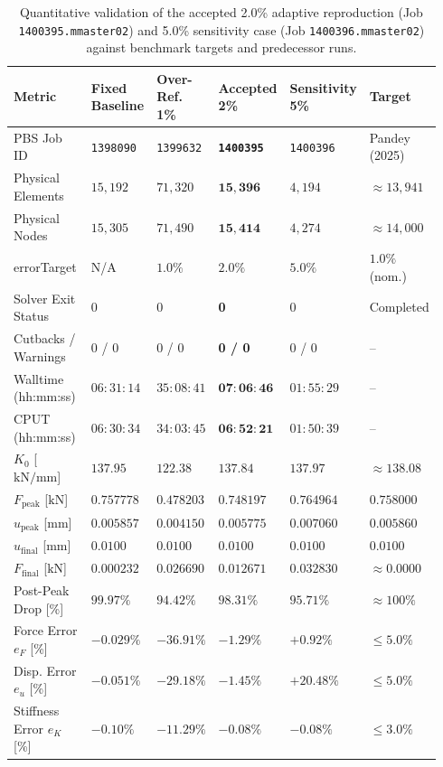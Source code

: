 \begin{table}[htbp]
\centering
\caption{Quantitative validation of the accepted 2.0\% adaptive reproduction (Job \texttt{1400395.mmaster02}) and 5.0\% sensitivity case (Job \texttt{1400396.mmaster02}) against benchmark targets and predecessor runs.}
\label{tab:task5_final_metrics}
\footnotesize
\begin{tabularx}{\linewidth}{p{0.22\linewidth}p{0.14\linewidth}p{0.14\linewidth}p{0.16\linewidth}p{0.16\linewidth}p{0.12\linewidth}}
\toprule
\textbf{Metric} & \textbf{Fixed Baseline} & \textbf{Over-Ref. 1\%} & \textbf{Accepted 2\%} & \textbf{Sensitivity 5\%} & \textbf{Target} \\
\midrule
PBS Job ID & \texttt{1398090} & \texttt{1399632} & \textbf{\texttt{1400395}} & \texttt{1400396} & Pandey (2025) \\
Physical Elements & $15{,}192$ & $71{,}320$ & $\mathbf{15{,}396}$ & $4{,}194$ & $\approx 13{,}941$ \\
Physical Nodes & $15{,}305$ & $71{,}490$ & $\mathbf{15{,}414}$ & $4{,}274$ & $\approx 14{,}000$ \\
errorTarget & N/A & $1.0\%$ & $\mathbf{2.0\%}$ & $5.0\%$ & $1.0\%$ (nom.) \\
Solver Exit Status & 0 & 0 & \textbf{0} & 0 & Completed \\
Cutbacks / Warnings & 0 / 0 & 0 / 0 & \textbf{0 / 0} & 0 / 0 & -- \\
Walltime (hh:mm:ss) & $06:31:14$ & $35:08:41$ & $\mathbf{07:06:46}$ & $01:55:29$ & -- \\
CPUT (hh:mm:ss) & $06:30:34$ & $34:03:45$ & $\mathbf{06:52:21}$ & $01:50:39$ & -- \\
\midrule
$K_0$ [$\mathrm{kN/mm}$] & $137.95$ & $122.38$ & $\mathbf{137.84}$ & $137.97$ & $\approx 138.08$ \\
$F_{\text{peak}}$ [$\mathrm{kN}$] & $0.757778$ & $0.478203$ & $\mathbf{0.748197}$ & $0.764964$ & $0.758000$ \\
$u_{\text{peak}}$ [$\mathrm{mm}$] & $0.005857$ & $0.004150$ & $\mathbf{0.005775}$ & $0.007060$ & $0.005860$ \\
$u_{\text{final}}$ [$\mathrm{mm}$] & $0.0100$ & $0.0100$ & $\mathbf{0.0100}$ & $0.0100$ & $0.0100$ \\
$F_{\text{final}}$ [$\mathrm{kN}$] & $0.000232$ & $0.026690$ & $\mathbf{0.012671}$ & $0.032830$ & $\approx 0.0000$ \\
Post-Peak Drop [\%] & $99.97\%$ & $94.42\%$ & $\mathbf{98.31\%}$ & $95.71\%$ & $\approx 100\%$ \\
\midrule
Force Error $e_F$ [\%] & $-0.029\%$ & $-36.91\%$ & $\mathbf{-1.29\%}$ & $+0.92\%$ & $\le 5.0\%$ \\
Disp. Error $e_u$ [\%] & $-0.051\%$ & $-29.18\%$ & $\mathbf{-1.45\%}$ & $\mathbf{+20.48\%}$ & $\le 5.0\%$ \\
Stiffness Error $e_K$ [\%] & $-0.10\%$ & $-11.29\%$ & $\mathbf{-0.08\%}$ & $-0.08\%$ & $\le 3.0\%$ \\
\bottomrule
\end{tabularx}
\end{table}

